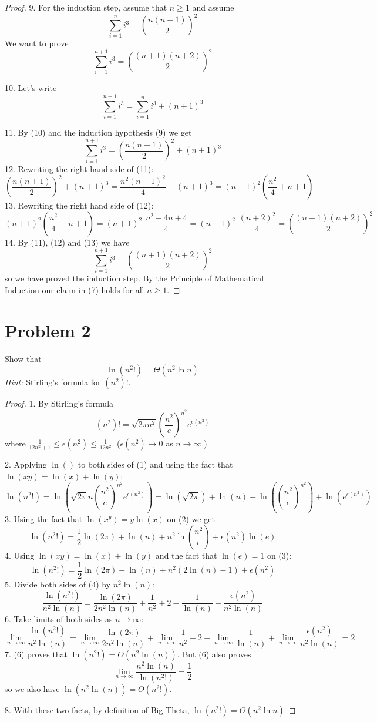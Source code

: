 \documentclass[14pt]{extarticle}
\begin{document}
\begin{proof}
9. For the induction step, assume that $n \geq 1$ and assume 
$$
\sum_{i = 1}^{n}i^3 = \left(\frac{n(n+1)}{2}\right)^2
$$
We want to prove
$$
\sum_{i = 1}^{n+1}i^3 = \left(\frac{(n+1)(n+2)}{2}\right)^2
$$

10. Let's write
$$
\sum_{i = 1}^{n+1}i^3 = \sum_{i = 1}^{n}i^3 + (n+1)^3
$$

11. By (10) and the induction hypothesis (9) we get
$$
\sum_{i = 1}^{n+1}i^3 = \left(\frac{n(n+1)}{2}\right)^2 + (n+1)^3
$$
12. Rewriting the right hand side of (11):
$$
\left(\frac{n(n+1)}{2}\right)^2 + (n+1)^3 = \frac{n^2(n+1)^2}{4} + (n+1)^3 = (n+1)^2\left(\frac{n^2}{4} + n + 1\right)
$$
13. Rewriting the right hand side of (12):
$$
(n+1)^2\left(\frac{n^2}{4} + n + 1\right) = (n+1)^2\,\,\frac{n^2 + 4n + 4}{4} = (n+1)^2\,\,\frac{(n+2)^2}{4} = \left(\frac{(n+1)(n+2)}{2}\right)^2
$$
14. By (11), (12) and (13) we have
$$
\sum_{i = 1}^{n+1}i^3 = \left(\frac{(n+1)(n+2)}{2}\right)^2
$$
so we have proved the induction step. By the Principle of Mathematical Induction our claim in (7) holds for all $n \geq 1$.
\end{proof}

\section{Problem 2}
Show that
$$
\ln(n^2!) = \Theta(n^2\ln n)
$$
{\it Hint:} Stirling's formula for $(n^2)!$.
\begin{proof}
1. By Stirling's formula
$$
(n^2)! = \sqrt{2\pi n^2}\left(\frac{n^2}{e}\right)^{n^2} e^{\epsilon(n^2)}
$$
where $\frac{1}{12n^2+1}\leq\epsilon(n^2)\leq\frac{1}{12n^2}$. ($\epsilon(n^2) \to 0$ as $n \to \infty$.)

2. Applying $\ln()$ to both sides of (1) and using the fact that $\ln(xy) = \ln(x) + \ln(y)$:
$$
\ln(n^2!) = \ln(\sqrt{2\pi}n\left(\frac{n^2}{e}\right)^{n^2} e^{\epsilon(n^2)}) = \ln(\sqrt{2\pi}) + \ln(n) + \ln(\left(\frac{n^2}{e}\right)^{n^2}) + \ln(e^{\epsilon(n^2)})
$$
3. Using the fact that $\ln(x^y) = y\ln(x)$ on (2) we get
$$
\ln(n^2!) = \frac{1}{2}\ln(2\pi) + \ln(n) + n^2\ln(\frac{n^2}{e}) + \epsilon(n^2)\ln(e)
$$
4. Using $\ln(xy) = \ln(x) + \ln(y)$ and the fact that $\ln(e) = 1$ on (3):
$$
\ln(n^2!) = \frac{1}{2}\ln(2\pi) + \ln(n) + n^2(2\ln(n) - 1) + \epsilon(n^2)
$$
5. Divide both sides of (4) by $n^2\ln(n)$:
$$
\frac{\ln(n^2!)}{n^2\ln(n)} = \frac{\ln(2\pi)}{2n^2\ln(n)} + \frac{1}{n^2} + 2 - \frac{1}{\ln(n)} + \frac{\epsilon(n^2)}{n^2\ln(n)}
$$
6. Take limits of both sides as $n \to \infty$:
$$
\lim_{n \to \infty}\frac{\ln(n^2!)}{n^2\ln(n)} = \lim_{n \to \infty}\frac{\ln(2\pi)}{2n^2\ln(n)} + \lim_{n \to \infty}\frac{1}{n^2} + 2 - \lim_{n \to \infty}\frac{1}{\ln(n)} + \lim_{n \to \infty}\frac{\epsilon(n^2)}{n^2\ln(n)} = 2
$$
7. (6) proves that $\ln(n^2!) = O(n^2\ln(n))$. But (6) also proves
$$
\lim_{n \to \infty}\frac{n^2\ln(n)}{\ln(n^2!)} = \frac{1}{2}
$$
so we also have $\ln(n^2\ln(n)) = O(n^2!)$. 

8. With these two facts, by definition of Big-Theta, $\ln(n^2!) = \Theta(n^2\ln n)$
\end{proof}
\end{document}
